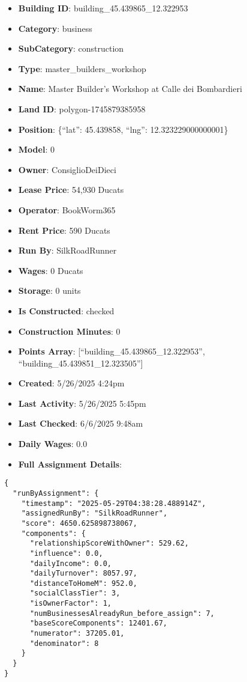 \documentclass[11pt,a4paper]{article}
\begin{document}
\begin{itemize}
\item \textbf{Building ID}: building\_45.439865\_12.322953
\item \textbf{Category}: business
\item \textbf{SubCategory}: construction
\item \textbf{Type}: master\_builders\_workshop
\item \textbf{Name}: Master Builder's Workshop at Calle dei Bombardieri
\item \textbf{Land ID}: polygon-1745879385958
\item \textbf{Position}: \{``lat'': 45.439858, ``lng'': 12.323229000000001\}
\item \textbf{Model}: 0
\item \textbf{Owner}: ConsiglioDeiDieci
\item \textbf{Lease Price}: 54,930 Ducats
\item \textbf{Operator}: BookWorm365
\item \textbf{Rent Price}: 590 Ducats
\item \textbf{Run By}: SilkRoadRunner
\item \textbf{Wages}: 0 Ducats
\item \textbf{Storage}: 0 units
\item \textbf{Is Constructed}: checked
\item \textbf{Construction Minutes}: 0
\item \textbf{Points Array}: [``building\_45.439865\_12.322953'', ``building\_45.439851\_12.323505'']
\item \textbf{Created}: 5/26/2025 4:24pm
\item \textbf{Last Activity}: 5/26/2025 5:45pm
\item \textbf{Last Checked}: 6/6/2025 9:48am
\item \textbf{Daily Wages}: 0.0
\item \textbf{Full Assignment Details}:
\end{itemize}

\begin{lstlisting}
{
  "runByAssignment": {
    "timestamp": "2025-05-29T04:38:28.488914Z",
    "assignedRunBy": "SilkRoadRunner",
    "score": 4650.625898738067,
    "components": {
      "relationshipScoreWithOwner": 529.62,
      "influence": 0.0,
      "dailyIncome": 0.0,
      "dailyTurnover": 8057.97,
      "distanceToHomeM": 952.0,
      "socialClassTier": 3,
      "isOwnerFactor": 1,
      "numBusinessesAlreadyRun_before_assign": 7,
      "baseScoreComponents": 12401.67,
      "numerator": 37205.01,
      "denominator": 8
    }
  }
}
\end{lstlisting}
\end{document}
